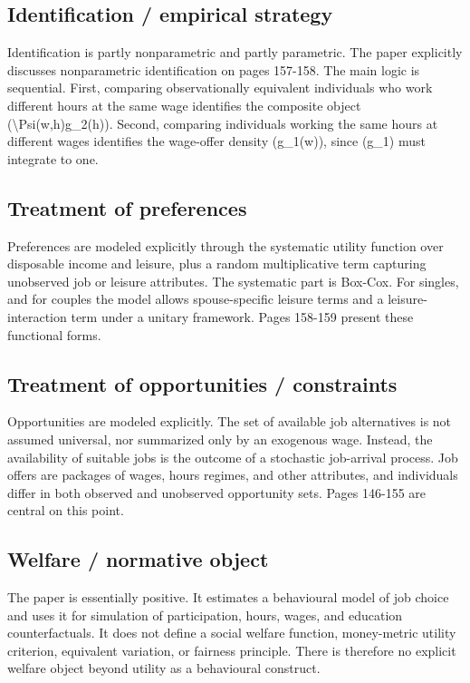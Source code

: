 \documentclass[11pt,a4paper]{article}
\begin{document}
\subsection*{Identification / empirical strategy}
Identification is partly nonparametric and partly parametric. The paper explicitly discusses nonparametric identification on pages 157-158. The main logic is sequential. First, comparing observationally equivalent individuals who work different hours at the same wage identifies the composite object (\textbackslash{}Psi(w,h)g\_2(h)). Second, comparing individuals working the same hours at different wages identifies the wage-offer density (g\_1(w)), since (g\_1) must integrate to one.

\subsection*{Treatment of preferences}
Preferences are modeled explicitly through the systematic utility function over disposable income and leisure, plus a random multiplicative term capturing unobserved job or leisure attributes. The systematic part is Box-Cox. For singles, and for couples the model allows spouse-specific leisure terms and a leisure-interaction term under a unitary framework. Pages 158-159 present these functional forms.

\subsection*{Treatment of opportunities / constraints}
Opportunities are modeled explicitly. The set of available job alternatives is not assumed universal, nor summarized only by an exogenous wage. Instead, the availability of suitable jobs is the outcome of a stochastic job-arrival process. Job offers are packages of wages, hours regimes, and other attributes, and individuals differ in both observed and unobserved opportunity sets. Pages 146-155 are central on this point.

\subsection*{Welfare / normative object}
The paper is essentially positive. It estimates a behavioural model of job choice and uses it for simulation of participation, hours, wages, and education counterfactuals. It does not define a social welfare function, money-metric utility criterion, equivalent variation, or fairness principle. There is therefore no explicit welfare object beyond utility as a behavioural construct.
\end{document}
